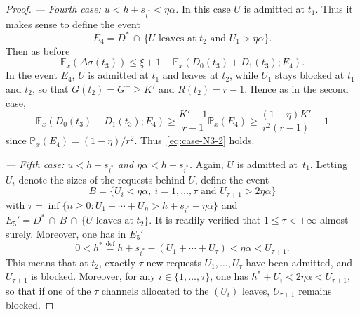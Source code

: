 \documentclass{amsart}
\def\E{\mathbb{E}}
\def\P{\mathbb{P}}
\begin{document}
\begin{proof}
    \noindent \textit{{--- Fourth case: $u < h + s_{i^*} < \eta \alpha$.}}
    In this case $U$ is admitted at $t_1$. Thus it makes sense to define the
    event
    \[
        E_4 = D^* \, \cap \, \{ U \text{ leaves at } t_2 \text{ and } U_1 > \eta \alpha \}.
    \]
Then as before
    \[ \E_x(\Delta \sigma(t_3)) \leq \xi + 1 - \E_x(D_0(t_3) + D_1(t_3) ; E_4). \]
In the event $E_4$, $U$ is admitted at $t_1$ and leaves at
$t_2$, while $U_1$ stays blocked at $t_1$ and $t_2$,
so that $G(t_2) = G^- \geq K'$ and $R(t_2) = r - 1$. Hence as in the
second case,
\[ \E_x(D_0(t_3) + D_1(t_3) ; E_4) \geq \frac{K' - 1}{r - 1} \P_x (E_4)
\geq \frac{(1-\eta)K'}{r^2(r-1)} - 1 \] since $\P_x(E_4) =
(1-\eta)/r^2$. Thus~\eqref{eq:case-N3-2} holds.

\noindent \textit{{--- Fifth case: $u < h + s_{i^*}$ {\rm and} $\eta
\alpha < h + s_{i^*}$.}} Again, $U$ is admitted at~$t_1$. Letting
$U_i$ denote the sizes of the requests behind $U$, define the event
$$ B = \{U_i < \eta \alpha,\ i = 1, \ldots, \tau \text{ and } U_{\tau
+ 1} > 2 \eta \alpha\} $$ with $\tau = \inf \{ n \geq 0: U_1 +
\cdots + U_n > h + s_{i^*} - \eta \alpha \}$ and
    $ E_5' = D^* \, \cap \, B \, \cap \, \{U \text{ leaves at } t_2 \}.
    $
It is readily verified that $1 \leq \tau < +\infty$ almost surely.
Moreover, one has in $E_5'$
    \[ 0 < h^* \stackrel{\text{def}}{=} h + s_{i^*} - (U_1 + \cdots + U_{\tau})
    < \eta \alpha < U_{\tau + 1}. \]
This means that at $t_2$, exactly $\tau$ new requests $U_1, \ldots,
U_\tau$ have been admitted, and $U_{\tau + 1}$ is blocked. Moreover,
for any $i \in \{1, \ldots, \tau\}$, one has $h^* + U_i < 2 \eta
\alpha < U_{\tau + 1},$ so that if one of the $\tau$ channels
allocated to the $(U_i)$ leaves, $U_{\tau + 1}$ remains blocked.



\end{proof}
\end{document}
